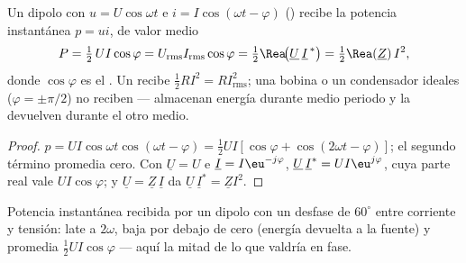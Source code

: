 \begin{theorem}\label{thm:b1:sinusoidal-impedance:power}
Un dipolo con $u = U\cos\omega t$ e $i = I\cos(\omega t - \varphi)$
() recibe la potencia instantánea $p = ui$, de valor
medio
\[
P = \tfrac12\,UI\cos\varphi = U_{\mathrm{rms}}I_{\mathrm{rms}}\cos\varphi
= \tfrac12\Rea\!\big(\underline U\,\underline I^{\,*}\big) = \tfrac12\Rea(\underline Z)\,I^2,
\]
donde $\cos\varphi$ es el \emph{}. Un  recibe
$\tfrac12 RI^2 = RI_{\mathrm{rms}}^2$; una bobina o un condensador ideales
($\varphi = \pm\pi/2$) no reciben  --- almacenan energía
durante medio periodo y la devuelven durante el otro medio.
\end{theorem}

\begin{proof}
$p = UI\cos\omega t\cos(\omega t - \varphi) = \tfrac12 UI[\cos\varphi +
\cos(2\omega t - \varphi)]$; el segundo término promedia cero. Con
$\underline U = U$ e $\underline I = I\eu^{-j\varphi}$,
$\underline U\,\underline I^* = UI\eu^{j\varphi}$, cuya parte real vale
$UI\cos\varphi$; y $\underline U = \underline Z\,\underline I$ da
$\underline U\,\underline I^* = \underline Z I^2$.
\end{proof}

\begin{omfigure}

{\small Potencia instantánea recibida por un dipolo con un desfase de
$60^\circ$ entre corriente y tensión: late a $2\omega$, baja por debajo de
cero (energía devuelta a la fuente) y promedia $\tfrac12 UI\cos\varphi$
--- aquí la mitad de lo que valdría en fase.}
\end{omfigure}

